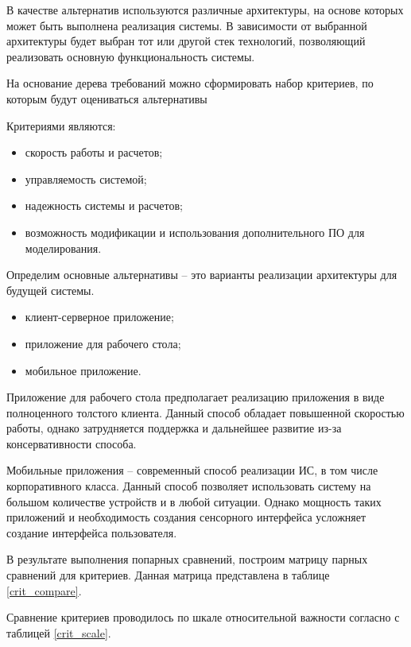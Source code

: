 В качестве альтернатив используются различные архитектуры, на основе которых может быть выполнена реализация системы. 
В зависимости от выбранной архитектуры будет выбран тот или другой стек технологий, позволяющий реализовать основную функциональность системы. 

На основание дерева требований можно сформировать набор критериев, по которым будут оцениваться альтернативы

Критериями являются:
\begin{itemize}
  \item скорость работы и расчетов;
  \item управляемость системой;
  \item надежность системы и расчетов;
  \item возможность модификации и использования дополнительного ПО для моделирования.
\end{itemize}

Определим основные альтернативы – это варианты реализации архитектуры для будущей системы.
\begin{itemize}
    \item клиент-серверное приложение;
    \item приложение для рабочего стола;
    \item мобильное приложение.
\end{itemize}

Приложение для рабочего стола предполагает реализацию приложения в виде полноценного толстого клиента. 
Данный способ обладает повышенной скоростью работы, однако затрудняется поддержка и дальнейшее развитие из-за консервативности способа. 

Мобильные приложения – современный способ реализации ИС, в том числе корпоративного класса. 
Данный способ позволяет использовать систему на большом количестве устройств и в любой ситуации. 
Однако мощность таких приложений и необходимость создания сенсорного интерфейса усложняет создание интерфейса пользователя.

В результате выполнения попарных сравнений, построим матрицу парных сравнений для критериев. 
Данная матрица представлена в таблице \ref{crit_compare}.

Сравнение критериев проводилось по шкале относительной важности согласно с таблицей \ref{crit_scale}.


